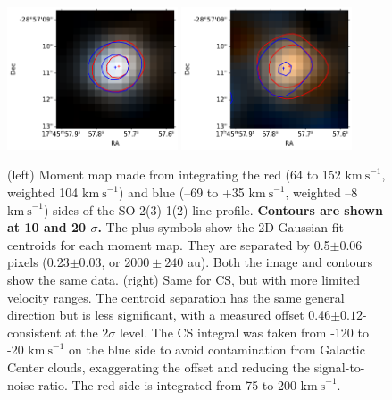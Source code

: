 \documentclass[]{aastex631}
\newcommand{\kms}{\ensuremath{\mathrm{km~s}^{-1}}\xspace}
\def\rr#1{\textbf{#1}}
\begin{document}
\begin{figure}
    \centering
    \includegraphics[width=0.45\textwidth]{figures/SOmoment_red_and_blue.pdf}
    \includegraphics[width=0.45\textwidth]{figures/CSmoment_redcs_and_bluecs.pdf}
    \caption{(left) Moment map made from integrating the red (64 to 152 \kms, weighted 104 \kms) and blue (--69 to +35 \kms, weighted --8 \kms) sides of the SO 2(3)-1(2) line profile.
    \rr{Contours are shown at 10 and 20 $\sigma$.}
    The plus symbols show the 2D Gaussian fit centroids for each moment map.
    They are separated by 0.5$\pm0.06$ pixels (0.23$\pm0.03$\arcsec, or $2000\pm240$ au).
    Both the image and contours show the same data.
    (right) Same for CS, but with more limited velocity ranges.  The centroid separation has the same general direction but is less significant, with a measured offset 0.46$\pm0.12$\arcsec - consistent at the $2\sigma$ level.  The CS integral was taken from -120 to -20 \kms on the blue side to avoid contamination from Galactic Center clouds, exaggerating the offset and reducing the signal-to-noise ratio.  The red side is integrated from 75 to 200 \kms.
    }
    \label{fig:SOredblue}
\end{figure}
\end{document}

